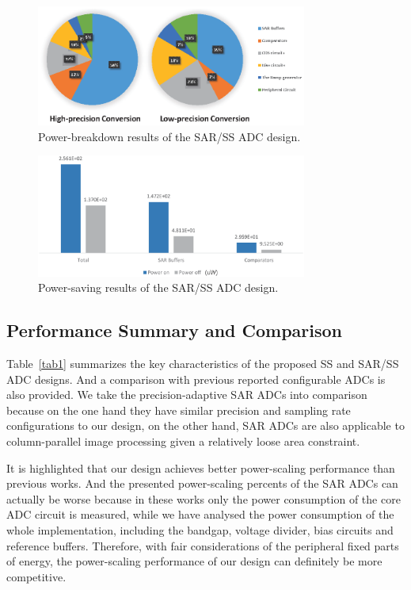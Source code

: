 \begin{figure}[htbp]
	\centerline{\includegraphics[width=3.5in]{./Figures/SARResults1.eps}}
	\caption{Power-breakdown results of the SAR/SS ADC design.}
	\label{SARresults1}
\end{figure} 

\begin{figure}[htbp]
	\centerline{\includegraphics[width=3.5in]{./Figures/SARResults2.eps}}
	\caption{Power-saving results of the SAR/SS ADC design.}
	\label{SARresults2}
\end{figure} 

\subsection{Performance Summary and Comparison}\label{summary}

Table~\ref{tab1} summarizes the key characteristics of the proposed SS and SAR/SS ADC designs.
And a comparison with previous reported configurable ADCs is also provided. 
We take the precision-adaptive SAR ADCs into comparison because on the one hand they have similar precision and sampling rate configurations to our design, on the other hand, SAR ADCs are also applicable to column-parallel image processing given a relatively loose area constraint.

It is highlighted that our design achieves better power-scaling performance than previous works. And the presented power-scaling percents of the SAR ADCs can actually be worse because in these works only the power consumption of the core ADC circuit is measured, while we have analysed the power consumption of the whole implementation, including the bandgap, voltage divider, bias circuits and reference buffers. Therefore, with fair considerations of the peripheral fixed parts of energy, the power-scaling performance of our design can definitely be more competitive.

